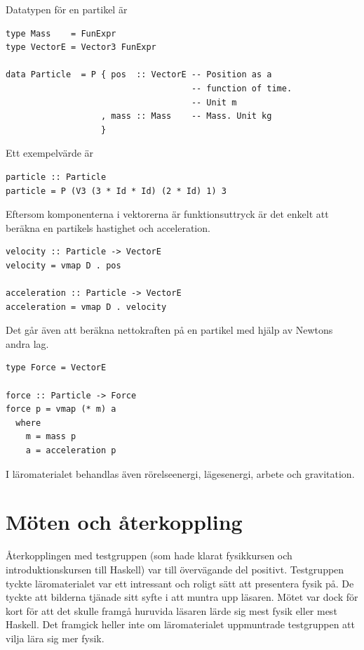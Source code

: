 Datatypen för en partikel är

\begin{lstlisting}
type Mass    = FunExpr
type VectorE = Vector3 FunExpr

data Particle  = P { pos  :: VectorE -- Position as a
                                     -- function of time.
                                     -- Unit m
                   , mass :: Mass    -- Mass. Unit kg
                   }
\end{lstlisting}

Ett exempelvärde är

\begin{lstlisting}
particle :: Particle
particle = P (V3 (3 * Id * Id) (2 * Id) 1) 3
\end{lstlisting}

Eftersom komponenterna i vektorerna är funktionsuttryck är det enkelt att beräkna en partikels hastighet och acceleration.

\begin{lstlisting}
velocity :: Particle -> VectorE
velocity = vmap D . pos

acceleration :: Particle -> VectorE
acceleration = vmap D . velocity
\end{lstlisting}

Det går även att beräkna nettokraften på en partikel med hjälp av Newtons andra lag.

\begin{lstlisting}
type Force = VectorE

force :: Particle -> Force
force p = vmap (* m) a
  where
    m = mass p
    a = acceleration p
\end{lstlisting}

I läromaterialet behandlas även rörelseenergi, lägesenergi, arbete och gravitation.

\section{Möten och återkoppling}\label{sec:res_test}

Återkopplingen med testgruppen (som hade klarat fysikkursen och 
introduktionskursen till Haskell) var till övervägande del positivt.
Testgruppen tyckte läromaterialet var ett intressant och roligt sätt att
presentera fysik på. De tyckte att bilderna tjänade sitt syfte i att muntra upp
läsaren. Mötet var dock för kort för att det skulle framgå huruvida läsaren lärde
sig mest fysik eller mest Haskell. Det framgick heller inte om läromaterialet
uppmuntrade testgruppen att vilja lära sig mer fysik.

